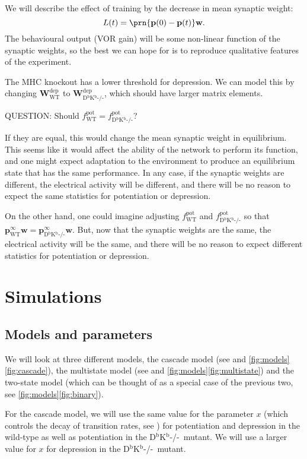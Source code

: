 \documentclass[12pt]{article}
\newcommand{\pr}{\mathbf{p}}
\newcommand{\eq}{\pr^\infty}
\newcommand{\w}{\mathbf{w}}
\newcommand{\W}{\mathbf{W}}
\newcommand{\pot}{^{\text{pot}}}
\newcommand{\dep}{^{\text{dep}}}
\newcommand{\wt}{_{\text{WT}}}
\newcommand{\kn}{_{\text{D$^\mathrm{b}$K$^\mathrm{b}$-/-}}}
\newcommand{\Kn}{D$^\mathrm{b}$K$^\mathrm{b}$-/-}
\begin{document}
We will describe the effect of training by the decrease in mean synaptic weight:
%
\begin{equation}\label{eq:learning}
  L(t) = \prn{\pr(0)-\pr(t)}\w.
\end{equation}
%
The behavioural output (VOR gain) will be some non-linear function of the synaptic weights, so the best we can hope for is to reproduce qualitative features of the experiment.

The MHC knockout has a lower threshold for depression.
We can model this by changing $\W\dep\wt$ to $\W\dep\kn$, which should have larger matrix elements.

QUESTION: Should $f\pot\wt=f\pot\kn$?

If they are equal, this would change the mean synaptic weight in equilibrium.
This seems like it would affect the ability of the network to perform its function, and one might expect adaptation to the environment to produce an equilibrium state that has the same performance.
In any case, if the synaptic weights are different, the electrical activity will be different, and there will be no reason to expect the same statistics for potentiation or depression.

On the other hand, one could imagine adjusting $f\pot\wt$ and $f\pot\kn$ so that $\eq\wt\w = \eq\kn\w$.
But, now that the synaptic weights are the same, the electrical activity will be the same, and there will be no reason to expect different statistics for potentiation or depression.


\section{Simulations}\label{sec:sims}

\subsection{Models and parameters}

We will look at three different models, the cascade model (see \cite{Fusi2005cascade} and \autoref{fig:models}\ref{fig:cascade}), the multistate model (see \cite{amit1994learning,Fusi2007multistate} and \autoref{fig:models}\ref{fig:multistate}) and the two-state model (which can be thought of as a special case of the previous two, see \autoref{fig:models}\ref{fig:binary}).

For the cascade model, we will use the same value for the parameter $x$ (which controls the decay of transition rates, see \cite{Fusi2005cascade}) for potentiation and depression in the wild-type as well as potentiation in the \Kn\ mutant. We will use a larger value for $x$ for depression in the \Kn\ mutant.
\end{document}
